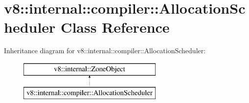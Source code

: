 \hypertarget{classv8_1_1internal_1_1compiler_1_1_allocation_scheduler}{}\section{v8\+:\+:internal\+:\+:compiler\+:\+:Allocation\+Scheduler Class Reference}
\label{classv8_1_1internal_1_1compiler_1_1_allocation_scheduler}
Inheritance diagram for v8\+:\+:internal\+:\+:compiler\+:\+:Allocation\+Scheduler\+:\begin{figure}[H]
\begin{center}
\leavevmode
\includegraphics[height=2.000000cm]{classv8_1_1internal_1_1compiler_1_1_allocation_scheduler}
\end{center}
\end{figure}
